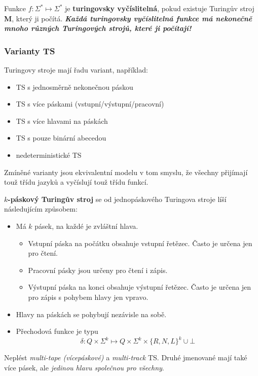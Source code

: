 \documentclass[11pt]{report} %
\numberwithin{equation}{section}
\begin{document}
Funkce $f : \Sigma^* \mapsto \Sigma^*$ je \textbf{turingovsky vyčíslitelná}, pokud existuje Turingův stroj \textbf{M}, který ji počítá. \textbf{\textit{Každá turingovsky vyčíslitelná funkce má nekonečně mnoho různých Turingových strojů, 	které ji počítají!}}

\subsubsection{Varianty TS}
Turingovy stroje mají řadu variant, například:
\begin{itemize}
	
	
	\item TS s jednosměrně nekonečnou páskou
	\item TS s více páskami (vstupní/výstupní/pracovní)
	\item TS s více hlavami na páskách
	\item TS s pouze binární abecedou
	\item nedeterministické TS
\end{itemize}
Zmíněné varianty jsou ekvivalentní  modelu v tom smyslu, že všechny přijímají touž třídu jazyků a vyčíslují touž třídu funkcí.

\textbf{$k$-páskový Turingův stroj} se od jednopáskového Turingova stroje líší následujícím způsobem:
\begin{itemize}
	
	
	\item Má $k$ pásek, na každé je zvláštní hlava.
	\begin{itemize}
		
			
		\item Vstupní páska na počátku obsahuje vstupní řetězec. Často je určena jen pro čtení.
		\item Pracovní pásky jsou určeny pro čtení i zápis.
		\item Výstupní páska na konci obsahuje výstupní řetězec. Často je určena jen pro zápis s pohybem hlavy jen vpravo.
	\end{itemize}
	\item Hlavy na páskách se pohybují nezávisle na sobě.
	\item Přechodová funkce je typu
		$$\delta : Q \times \Sigma^k \mapsto Q \times \Sigma^k \times \{R, N, L\}^k \cup {\bot}$$
\end{itemize}

Neplést \textit{multi-tape (vícepáskové)} a \textit{multi-track} TS. Druhé jmenované mají také více pásek, ale \textit{jedinou hlavu společnou pro všechny}.
\end{document}
